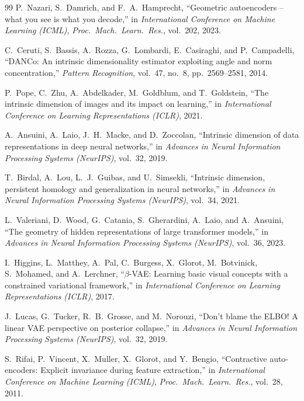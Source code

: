 \documentclass[11pt,a4paper]{jsarticle}
\begin{document}
\begin{thebibliography}{99}
P.~Nazari, S.~Damrich, and F.~A.~Hamprecht,
``Geometric autoencoders -- what you see is what you decode,''
in \textit{International Conference on Machine Learning (ICML)},
\textit{Proc.~Mach.~Learn.~Res.}, vol.~202, 2023.

C.~Ceruti, S.~Bassis, A.~Rozza, G.~Lombardi, E.~Casiraghi, and P.~Campadelli,
``DANCo: An intrinsic dimensionality estimator exploiting angle and norm concentration,''
\textit{Pattern Recognition}, vol.~47, no.~8, pp.~2569--2581, 2014.

P.~Pope, C.~Zhu, A.~Abdelkader, M.~Goldblum, and T.~Goldstein,
``The intrinsic dimension of images and its impact on learning,''
in \textit{International Conference on Learning Representations (ICLR)}, 2021.

A.~Ansuini, A.~Laio, J.~H.~Macke, and D.~Zoccolan,
``Intrinsic dimension of data representations in deep neural networks,''
in \textit{Advances in Neural Information Processing Systems (NeurIPS)},
vol.~32, 2019.

T.~Birdal, A.~Lou, L.~J.~Guibas, and U.~Simsekli,
``Intrinsic dimension, persistent homology and generalization
in neural networks,''
in \textit{Advances in Neural Information Processing Systems (NeurIPS)},
vol.~34, 2021.

L.~Valeriani, D.~Wood, G.~Catania, S.~Gherardini, A.~Laio, and A.~Ansuini,
``The geometry of hidden representations of large transformer models,''
in \textit{Advances in Neural Information Processing Systems (NeurIPS)},
vol.~36, 2023.

I.~Higgins, L.~Matthey, A.~Pal, C.~Burgess, X.~Glorot, M.~Botvinick,
S.~Mohamed, and A.~Lerchner,
``$\beta$-VAE: Learning basic visual concepts with a constrained variational framework,''
in \textit{International Conference on Learning Representations (ICLR)}, 2017.

J.~Lucas, G.~Tucker, R.~B.~Grosse, and M.~Norouzi,
``Don't blame the ELBO! A linear VAE perspective on posterior collapse,''
in \textit{Advances in Neural Information Processing Systems (NeurIPS)}, vol.~32, 2019.

S.~Rifai, P.~Vincent, X.~Muller, X.~Glorot, and Y.~Bengio,
``Contractive auto-encoders: Explicit invariance during feature extraction,''
in \textit{International Conference on Machine Learning (ICML)},
\textit{Proc.~Mach.~Learn.~Res.}, vol.~28, 2011.


\end{thebibliography}
\end{document}
